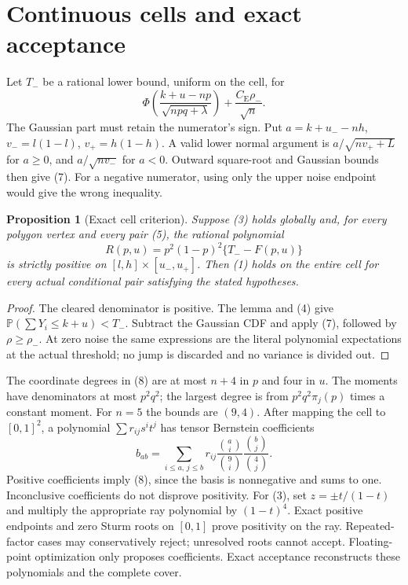 \documentclass[11pt,a4paper]{article}
\newcommand{\Pp}{\mathbb P}
\newcommand{\CE}{C_{\mathrm E}}
\newtheorem{proposition}{Proposition}
\begin{document}
\section{Continuous cells and exact acceptance}
Let $T_-$ be a rational lower bound, uniform on the cell, for
\[
 \Phi\left(\frac{k+u-np}{\sqrt{npq+\lambda}}\right)
                 +\frac{\CE\rho_-}{\sqrt n}.
 \tag{7}
\]
The Gaussian part must retain the numerator's sign. Put
$a=k+u_--nh$, $v_-=l(1-l)$, $v_+=h(1-h)$.
A valid lower normal argument is $a/\sqrt{nv_++L}$ for $a\ge0$,
and $a/\sqrt{nv_-}$ for $a<0$. Outward square-root and Gaussian
bounds then give (7). For a negative numerator, using only the
upper noise endpoint would give the wrong inequality.

\begin{proposition}[Exact cell criterion]
Suppose (3) holds globally and, for every polygon vertex and every
pair (5), the rational polynomial
\[
 R(p,u)=p^2(1-p)^2\{T_--F(p,u)\}
 \tag{8}
\]
is strictly positive on $[l,h]\times[u_-,u_+]$. Then (1) holds on
the entire cell for every actual conditional pair satisfying the
stated hypotheses.
\end{proposition}
\begin{proof}
The cleared denominator is positive. The lemma and (4) give
$\Pp(\sum Y_i\le k+u)<T_-$. Subtract the Gaussian CDF and apply
(7), followed by $\rho\ge\rho_-$. At zero noise the same expressions
are the literal polynomial expectations at the actual threshold;
no jump is discarded and no variance is divided out.
\end{proof}

The coordinate degrees in (8) are at most $n+4$ in $p$ and four in
$u$. The moments have denominators at most $p^2q^2$; the largest
degree is from $p^2q^2\pi_j(p)$ times a constant moment. For $n=5$
the bounds are $(9,4)$. After mapping the cell to $[0,1]^2$,
a polynomial $\sum r_{ij}s^it^j$ has tensor Bernstein coefficients
\[
 b_{ab}=\sum_{i\le a,\,j\le b}r_{ij}
          \frac{\binom ai}{\binom9i}
          \frac{\binom bj}{\binom4j}.
\]
Positive coefficients imply (8), since the basis is nonnegative
and sums to one. Inconclusive coefficients do not disprove positivity.
For (3), set $z=\pm t/(1-t)$ and multiply the appropriate ray
polynomial by $(1-t)^4$. Exact positive endpoints and zero Sturm
roots on $[0,1]$ prove positivity on the ray. Repeated-factor
cases may conservatively reject; unresolved roots cannot accept.
Floating-point optimization only proposes coefficients. Exact
acceptance reconstructs these polynomials and the complete cover.
\end{document}

